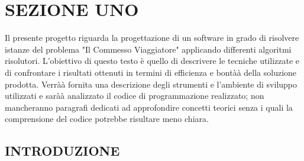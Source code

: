 \documentclass[11pt]{article}
\begin{document}
\section*{SEZIONE UNO}

Il presente progetto riguarda la progettazione di un software in grado di risolvere istanze del problema "Il Commesso Viaggiatore" applicando differenti algoritmi risolutori. L'obiettivo di questo testo è quello di descrivere le tecniche utilizzate e di confrontare i risultati ottenuti in termini di efficienza e bontà\`a della soluzione prodotta. Verrà\`a fornita una descrizione degli strumenti e l'ambiente di sviluppo utilizzati e sarà\`a analizzato il codice di programmazione realizzato; non mancheranno paragrafi dedicati ad approfondire concetti teorici senza i quali la comprensione del codice potrebbe risultare meno chiara. 

\subsection*{INTRODUZIONE}
\end{document}
